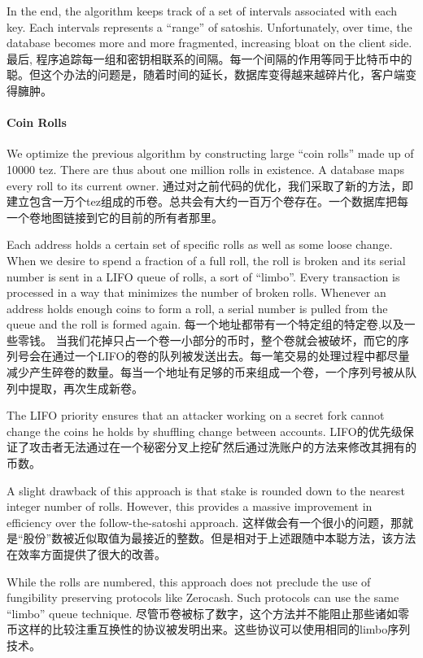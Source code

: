 \documentclass[letterpaper]{article}
\begin{document}
In the end, the algorithm keeps track of a set of intervals associated with each
key. Each intervals represents a ``range'' of satoshis.
Unfortunately, over time, the database becomes more and more fragmented,
increasing bloat on the client side.
最后, 程序追踪每一组和密钥相联系的间隔。每一个间隔的作用等同于比特币中的聪。但这个办法的问题是，随着时间的延长，数据库变得越来越碎片化，客户端变得臃肿。

\paragraph{Coin Rolls}
We optimize the previous algorithm by constructing large ``coin rolls'' made up
of \num{10000} tez. There are thus about one million rolls in existence. A
database maps every roll to its current owner.
通过对之前代码的优化，我们采取了新的方法，即建立包含一万个tez组成的币卷。总共会有大约一百万个卷存在。一个数据库把每一个卷地图链接到它的目前的所有者那里。

Each address holds a certain set of specific rolls as well as some loose change.
When we desire to spend a fraction of a full roll, the roll is broken and
its serial number is sent in a LIFO queue of rolls, a sort of ``limbo''. Every
transaction is processed in a way that minimizes the number of broken rolls.
Whenever an address holds enough coins to form a roll, a serial number is pulled
from the queue and the roll is formed again.
每一个地址都带有一个特定组的特定卷,以及一些零钱。
当我们花掉只占一个卷一小部分的币时，整个卷就会被破坏，而它的序列号会在通过一个LIFO的卷的队列被发送出去。每一笔交易的处理过程中都尽量减少产生碎卷的数量。每当一个地址有足够的币来组成一个卷，一个序列号被从队列中提取，再次生成新卷。


The LIFO priority ensures that an attacker working on a secret fork cannot
change the coins he holds by shuffling change between accounts.
LIFO的优先级保证了攻击者无法通过在一个秘密分叉上挖矿然后通过洗账户的方法来修改其拥有的币数。

A slight drawback of this approach is that stake is rounded down to the
nearest integer number of rolls. However, this provides a massive improvement
in efficiency over the follow-the-satoshi approach.
这样做会有一个很小的问题，那就是“股份”数被近似取值为最接近的整数。但是相对于上述跟随中本聪方法，该方法在效率方面提供了很大的改善。

While the rolls are numbered, this approach does not preclude the use of 
fungibility preserving protocols like Zerocash. Such protocols can use
the same ``limbo'' queue technique.
尽管币卷被标了数字，这个方法并不能阻止那些诸如零币这样的比较注重互换性的协议被发明出来。这些协议可以使用相同的limbo序列技术。
\end{document}
